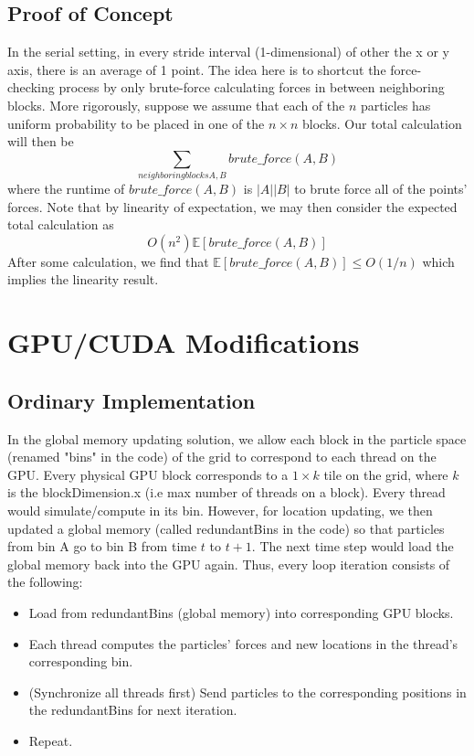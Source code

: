 \documentclass[12pt]{article}
\begin{document}
\subsection{Proof of Concept} In the serial setting, in every stride interval (1-dimensional) of other the x or y axis, there is an average of 1 point. The idea here is to shortcut the force-checking process by only brute-force calculating forces in between neighboring blocks.  More rigorously, suppose we assume that each of the $n$ particles has uniform probability to be placed in one of the $n \times n$ blocks. Our total calculation will then be $$\sum_{neighboring blocks A, B}  brute\_force(A, B)$$ where the runtime of $brute\_force(A,B)$ is $|A||B|$ to brute force all of the points' forces. Note that by linearity of expectation, we may then consider the expected total calculation as $$O(n^{2}) \mathbb{E} \left[brute\_force(A,B) \right]$$
After some calculation, we find that $\mathbb{E} \left[brute\_force(A,B) \right] \le O(1/n)$ which implies the linearity result. 

\section{GPU/CUDA Modifications}

\subsection{Ordinary Implementation}
In the global memory updating solution, we allow each block in the particle space (renamed "bins" in the code) of the grid to correspond to each thread on the GPU. Every physical GPU block corresponds to a $1 \times k$ tile on the grid, where $k$ is the blockDimension.x (i.e max number of threads on a block). Every thread would simulate/compute in its bin. However, for location updating, we then updated a global memory (called redundantBins in the code) so that particles from bin A go to bin B from time $t$ to $t+1$. The next time step would load the global memory back into the GPU again. Thus, every loop iteration consists of the following:

\begin{itemize}
\item Load from redundantBins (global memory) into corresponding GPU blocks. 
\item Each thread computes the particles' forces and new locations in the thread's corresponding bin. 
\item (Synchronize all threads first) Send particles to the corresponding positions in the redundantBins for next iteration. 
\item Repeat. 
\end{itemize}
\end{document}
